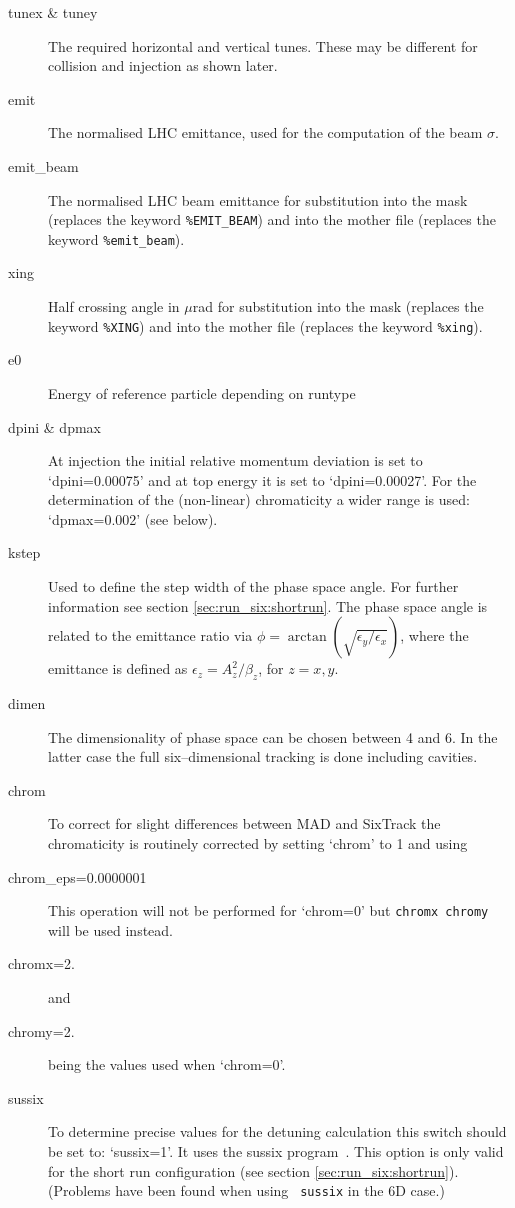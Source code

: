 \documentclass{cernatsnote}
\begin{document}
\begin{description}
\item [tunex \& tuney] The required horizontal and vertical tunes.
These may be different for collision and injection as shown later.
\item [emit] The normalised LHC emittance, used for the computation of the
  beam $\sigma$.
\item [emit\_beam] The normalised LHC beam emittance for substitution into 
  the mask (replaces the keyword \texttt{\%EMIT\_BEAM}) and into the mother file 
  (replaces the keyword \texttt{\%emit\_beam}).
\item [xing] Half crossing angle in $\mu$rad for substitution into the mask
  (replaces the keyword \texttt{\%XING}) and into the mother file (replaces 
  the keyword \texttt{\%xing}).
\item [e0] Energy of reference particle depending on runtype
\item [dpini \& dpmax]
  At injection the initial relative momentum deviation is set to
  `dpini=0.00075' and at top energy it is set to `dpini=0.00027'.
  For the determination of the (non-linear) chromaticity a wider range is used:
  `dpmax=0.002' (see below).
\item [kstep]
  Used to define the step width of the phase space angle. For further
  information see section \ref{sec:run_six:shortrun}. The phase space angle is
  related to the emittance ratio via
  $\phi=\arctan\left(\sqrt{{\epsilon_y}/{\epsilon_x}}\right)$, where the
  emittance is defined as $\epsilon_z=A_z^2/\beta_z$, for $z=x,y$.
\item [dimen]
  The dimensionality of phase space can be chosen between 4 and 6. In the
  latter case the full six--dimensional tracking is done including cavities.
\item [chrom]
  To correct for slight differences between MAD and SixTrack the chromaticity
  is routinely corrected by setting `chrom' to 1 and using
\item[chrom\_eps=0.0000001] This operation will not be performed for `chrom=0'
  but \texttt{chromx chromy} will be used instead.
\item[chromx=2.] and
\item[chromy=2.] being the values used when `chrom=0'.
\item [sussix]
  To determine precise values for the detuning calculation this switch should
  be set to: `sussix=1'. It uses the sussix program~\cite{lines3}. This option
  is only valid for the short run configuration (see section
  \ref{sec:run_six:shortrun}).  (Problems have been found when using {\tt
  sussix} in the 6D case.)
\end{description}
\end{document}

